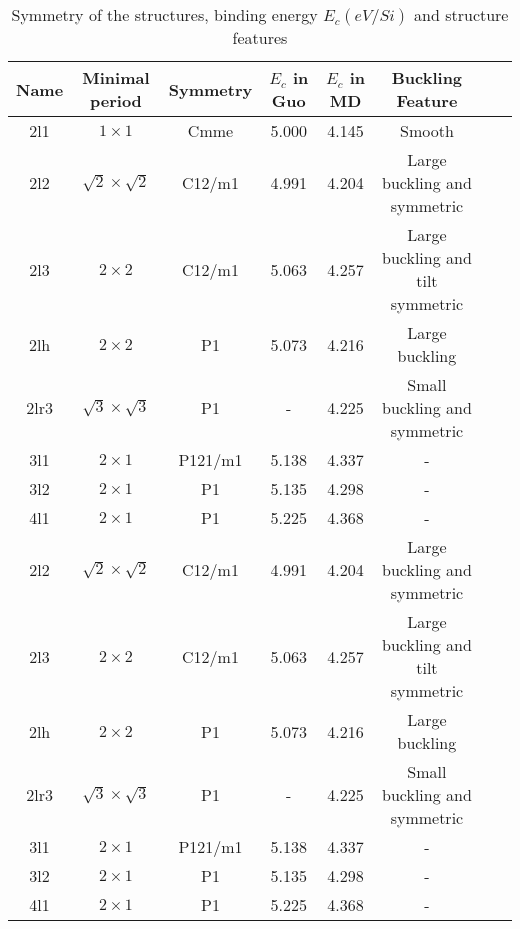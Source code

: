 \documentclass[%
 reprint,
 amsmath,amssymb,
 aps,
 prb,
]{revtex4-1}
\begin{document}
\begin{table*}
  \caption{\label{tab:table1}
    Symmetry of the structures, binding energy $E_c(eV/Si)$ and structure features}
  \begin{ruledtabular}
    \begin{tabular}{cccccccc}
      Name
           & Minimal period
           & Symmetry
           & $E_c$ in Guo
           & $E_c$ in MD
           & Buckling Feature                                                                       \\
      \hline
      2l1  & $1 \times 1$             & Cmme    & 5.000 & 4.145 & Smooth                            \\
      2l2  & $\sqrt{2}\times\sqrt{2}$ & C12/m1  & 4.991 & 4.204 & Large buckling and symmetric      \\
      2l3  & $2 \times 2$             & C12/m1  & 5.063 & 4.257 & Large buckling and tilt symmetric \\
      2lh  & $2 \times 2$             & P1      & 5.073 & 4.216 & Large buckling                    \\
      2lr3 & $\sqrt{3}\times\sqrt{3}$ & P1      & -     & 4.225 & Small buckling and symmetric      \\
      3l1  & $2 \times 1$             & P121/m1 & 5.138 & 4.337 & -                                 \\
      3l2  & $2 \times 1$             & P1      & 5.135 & 4.298 & -                                 \\
      4l1  & $2 \times 1$             & P1      & 5.225 & 4.368 & -                                 \\
      2l2  & $\sqrt{2}\times\sqrt{2}$ & C12/m1  & 4.991 & 4.204 & Large buckling and symmetric      \\
      2l3  & $2 \times 2$             & C12/m1  & 5.063 & 4.257 & Large buckling and tilt symmetric \\
      2lh  & $2 \times 2$             & P1      & 5.073 & 4.216 & Large buckling                    \\
      2lr3 & $\sqrt{3}\times\sqrt{3}$ & P1      & -     & 4.225 & Small buckling and symmetric      \\
      3l1  & $2 \times 1$             & P121/m1 & 5.138 & 4.337 & -                                 \\
      3l2  & $2 \times 1$             & P1      & 5.135 & 4.298 & -                                 \\
      4l1  & $2 \times 1$             & P1      & 5.225 & 4.368 & -                                 \\
    \end{tabular}
  \end{ruledtabular}

\end{table*}
\end{document}

